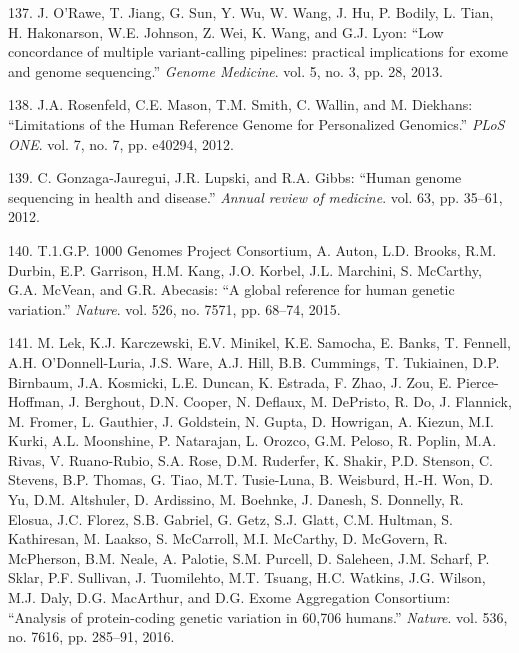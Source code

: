 \documentclass[12pt,twoside]{reedthesis}
\theoremstyle{definition}
\theoremstyle{definition}
\theoremstyle{remark}
\begin{document}
  \hypertarget{ref-ORawe2013}{}
  137. J. O'Rawe, T. Jiang, G. Sun, Y. Wu, W. Wang, J. Hu, P. Bodily, L.
  Tian, H. Hakonarson, W.E. Johnson, Z. Wei, K. Wang, and G.J. Lyon: ``Low
  concordance of multiple variant-calling pipelines: practical
  implications for exome and genome sequencing.'' \emph{Genome Medicine}.
  vol. 5, no. 3, pp. 28, 2013.
  
  \hypertarget{ref-Rosenfeld2012}{}
  138. J.A. Rosenfeld, C.E. Mason, T.M. Smith, C. Wallin, and M. Diekhans:
  ``Limitations of the Human Reference Genome for Personalized Genomics.''
  \emph{PLoS ONE}. vol. 7, no. 7, pp. e40294, 2012.
  
  \hypertarget{ref-Gonzaga-Jauregui2012}{}
  139. C. Gonzaga-Jauregui, J.R. Lupski, and R.A. Gibbs: ``Human genome
  sequencing in health and disease.'' \emph{Annual review of medicine}.
  vol. 63, pp. 35--61, 2012.
  
  \hypertarget{ref-1000GenomesProjectConsortium2015}{}
  140. T.1.G.P. 1000 Genomes Project Consortium, A. Auton, L.D. Brooks,
  R.M. Durbin, E.P. Garrison, H.M. Kang, J.O. Korbel, J.L. Marchini, S.
  McCarthy, G.A. McVean, and G.R. Abecasis: ``A global reference for human
  genetic variation.'' \emph{Nature}. vol. 526, no. 7571, pp. 68--74,
  2015.
  
  \hypertarget{ref-Lek2016}{}
  141. M. Lek, K.J. Karczewski, E.V. Minikel, K.E. Samocha, E. Banks, T.
  Fennell, A.H. O'Donnell-Luria, J.S. Ware, A.J. Hill, B.B. Cummings, T.
  Tukiainen, D.P. Birnbaum, J.A. Kosmicki, L.E. Duncan, K. Estrada, F.
  Zhao, J. Zou, E. Pierce-Hoffman, J. Berghout, D.N. Cooper, N. Deflaux,
  M. DePristo, R. Do, J. Flannick, M. Fromer, L. Gauthier, J. Goldstein,
  N. Gupta, D. Howrigan, A. Kiezun, M.I. Kurki, A.L. Moonshine, P.
  Natarajan, L. Orozco, G.M. Peloso, R. Poplin, M.A. Rivas, V.
  Ruano-Rubio, S.A. Rose, D.M. Ruderfer, K. Shakir, P.D. Stenson, C.
  Stevens, B.P. Thomas, G. Tiao, M.T. Tusie-Luna, B. Weisburd, H.-H. Won,
  D. Yu, D.M. Altshuler, D. Ardissino, M. Boehnke, J. Danesh, S. Donnelly,
  R. Elosua, J.C. Florez, S.B. Gabriel, G. Getz, S.J. Glatt, C.M. Hultman,
  S. Kathiresan, M. Laakso, S. McCarroll, M.I. McCarthy, D. McGovern, R.
  McPherson, B.M. Neale, A. Palotie, S.M. Purcell, D. Saleheen, J.M.
  Scharf, P. Sklar, P.F. Sullivan, J. Tuomilehto, M.T. Tsuang, H.C.
  Watkins, J.G. Wilson, M.J. Daly, D.G. MacArthur, and D.G. Exome
  Aggregation Consortium: ``Analysis of protein-coding genetic variation
  in 60,706 humans.'' \emph{Nature}. vol. 536, no. 7616, pp. 285--91,
  2016.
  
\end{document}
